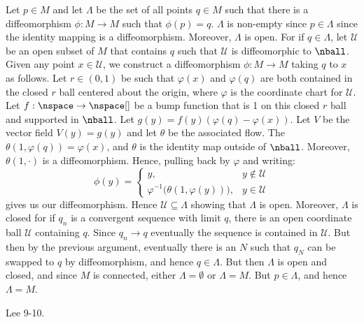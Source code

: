     \begin{problem}
        Let $p\in{M}$ and let $\Lambda$ be the set of all points $q\in{M}$
        such that there is a diffeomorphism $\phi:M\rightarrow{M}$ such that
        $\phi(p)=q$. $\Lambda$ is non-empty since $p\in\Lambda$ since the
        identity mapping is a diffeomorphism. Moreover, $\Lambda$ is open.
        For if $q\in\Lambda$, let $\mathcal{U}$ be an open subset of $M$
        that contains $q$ such that $\mathcal{U}$ is diffeomorphic to
        $\nball$. Given any point $x\in\mathcal{U}$, we construct a
        diffeomorphism $\phi:M\rightarrow{M}$ taking $q$ to $x$ as follows.
        Let $r\in(0,1)$ be such that $\varphi(x)$ and $\varphi(q)$ are both
        contained in the closed $r$ ball centered about the origin, where
        $\varphi$ is the coordinate chart for $\mathcal{U}$.
        Let $f:\nspace\rightarrow\nspace[]$ be a bump function that is 1 on
        this closed $r$ ball and supported in $\nball$. Let
        $g(y)=f(y)(\varphi(q)-\varphi(x))$. Let $V$ be the vector field
        $V(y)=g(y)$ and let $\theta$ be the associated flow. The
        $\theta(1,\varphi(q))=\varphi(x)$, and $\theta$ is the identity
        map outside of $\nball$. Moreover, $\theta(1,\cdot)$ is a
        diffeomorphism. Hence, pulling back by $\varphi$ and writing:
        \begin{equation}
            \phi(y)=
            \begin{cases}
                y,&y\notin\mathcal{U}\\
                \varphi^{\minus{1}}\big(\theta(1,\varphi(y))\big),&
                    y\in\mathcal{U}
            \end{cases}
        \end{equation}
        gives us our diffeomorphism. Hence $\mathcal{U}\subseteq\Lambda$
        showing that $\Lambda$ is open. Moreover, $\Lambda$ is closed for
        if $q_{n}$ is a convergent sequence with limit $q$, there is an
        open coordinate ball $\mathcal{U}$ containing $q$. Since
        $q_{n}\rightarrow{q}$ eventually the sequence is contained in
        $\mathcal{U}$. But then by the previous argument, eventually there
        is an $N$ such that $q_{N}$ can be swapped to $q$ by diffeomorphism,
        and hence $q\in\Lambda$. But then $\Lambda$ is open and closed, and
        since $M$ is connected, either $\Lambda=\emptyset$ or $\Lambda=M$.
        But $p\in\Lambda$, and hence $\Lambda=M$.
    \end{problem}
    \begin{problem}
        Lee 9-10.
    \end{problem}

